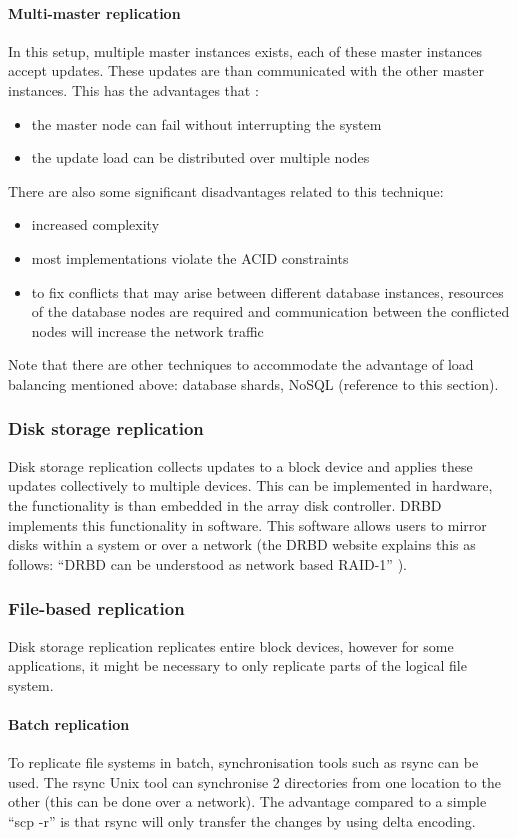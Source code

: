 \documentclass[12pt]{report}
\begin{document}
\paragraph*{Multi-master replication}
In this setup, multiple master instances exists, each of these master
instances accept updates. These updates are than communicated with the
other master instances. 
This has the advantages that :
\begin{itemize}
\item the master node can fail without interrupting the system
\item the update load can be distributed over multiple nodes
\end{itemize}
There are also some significant disadvantages related to this technique:
\begin{itemize} 
\item increased complexity
\item most implementations violate the ACID constraints
\item to fix conflicts that may arise between different database
  instances, resources of the database nodes are required and
  communication between the conflicted nodes will increase the network
  traffic
\end{itemize}
Note that there are other techniques to accommodate the advantage of
load balancing mentioned above: database shards, NoSQL (reference to
this section).

\subsubsection{Disk storage replication}
Disk storage replication collects updates to a block device and
applies these updates collectively to multiple devices.
This can be implemented in hardware, the functionality is than
embedded in the array disk controller.
DRBD \cite{drbd_soft:2013} implements this functionality in software.
This software allows users to mirror disks within a system or over a
network (the DRBD website explains this as follows: ``DRBD can be
understood as network based RAID-1'' \cite{drbd_soft:2013}).

\subsubsection{File-based replication}
Disk storage replication replicates entire block devices, however for
some applications, it might be necessary to only replicate parts of
the logical file system.
\paragraph*{Batch replication}
To replicate file systems in batch, synchronisation tools such as
rsync \cite{rsync_software:2013} can be
used. The rsync Unix tool can synchronise 2 directories from one location to the
other (this can be done over a network). The advantage compared to a
simple ``scp -r'' is that rsync will only transfer the changes by using
delta encoding.
\end{document}
